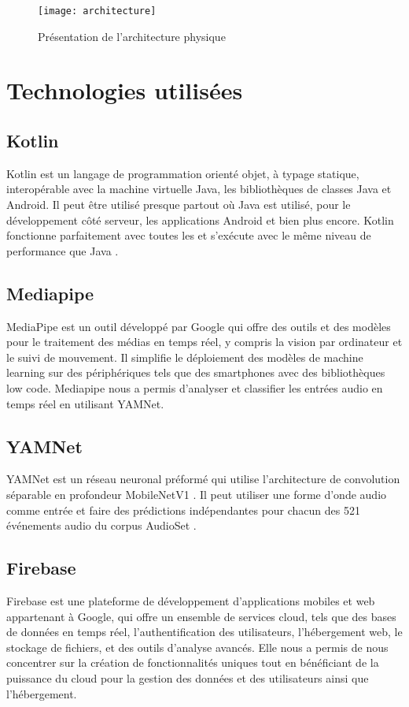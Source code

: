 \begin{figure}[H]
	\centering
	\texttt{[image: architecture]}
	\caption{Présentation de l'architecture physique}
\end{figure}

\section{Technologies utilisées}
\subsection{Kotlin}
Kotlin est un langage de programmation orienté objet, à typage statique, interopérable avec la machine virtuelle Java, les bibliothèques de classes Java et Android.
Il peut être utilisé presque partout où Java est utilisé, pour le développement côté serveur, les applications Android et bien plus encore. Kotlin fonctionne parfaitement avec toutes les et s'exécute avec le même niveau de performance que Java \cite{dmitry_jemerov_kotlin}.

\subsection{Mediapipe}
MediaPipe est un outil développé par Google qui offre des outils et des modèles pour le traitement des médias en temps réel, y compris la vision par ordinateur et le suivi de mouvement. Il simplifie le déploiement des modèles de machine learning sur des périphériques tels que des smartphones avec des bibliothèques low code.
Mediapipe nous a permis d'analyser et classifier les entrées audio en temps réel en utilisant YAMNet.

\subsection{YAMNet}
YAMNet\cite{yamnet} est un réseau neuronal préformé qui utilise l'architecture de convolution séparable en profondeur MobileNetV1 \cite{andrew_g_howard_menglong_zhu_bo_chen_dmitry_kalenichenko_weijun_wang_tobias_weyand_marco_andreetto_hartwig_adam_mobilenets}. Il peut utiliser une forme d'onde audio comme entrée et faire des prédictions indépendantes pour chacun des 521 événements audio du corpus AudioSet \cite{dataset_large_scale}.

\subsection{Firebase}
Firebase est une plateforme de développement d'applications mobiles et web appartenant à Google, qui offre un ensemble de services cloud, tels que des bases de données en temps réel, l'authentification des utilisateurs, l'hébergement web, le stockage de fichiers, et des outils d'analyse avancés. Elle nous a permis de nous concentrer sur la création de fonctionnalités uniques tout en bénéficiant de la puissance du cloud pour la gestion des données et des utilisateurs ainsi que l'hébergement.

